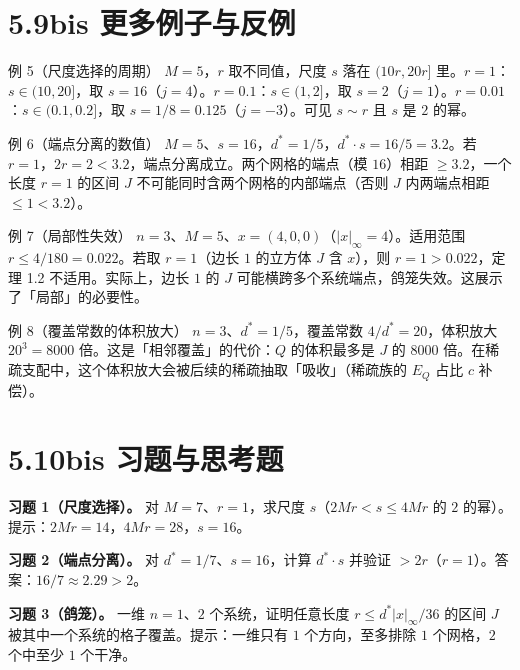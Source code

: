 \documentclass[a4paper,11pt,openany]{ctexbook}
\numberwithin{equation}{chapter}
\numberwithin{figure}{chapter}
\numberwithin{table}{chapter}
\begin{document}
\section{5.9bis 更多例子与反例}

\begin{examplebox}{例 5（尺度选择的周期）}
$M=5$，$r$ 取不同值，尺度 $s$ 落在 $(10r,20r]$ 里。$r=1$：$s\in(10,20]$，取 $s=16$（$j=4$）。$r=0.1$：$s\in(1,2]$，取 $s=2$（$j=1$）。$r=0.01$：$s\in(0.1,0.2]$，取 $s=1/8=0.125$（$j=-3$）。可见 $s\sim r$ 且 $s$ 是 $2$ 的幂。
\end{examplebox}

\begin{examplebox}{例 6（端点分离的数值）}
$M=5$、$s=16$，$d^*=1/5$，$d^*\cdot s=16/5=3.2$。若 $r=1$，$2r=2<3.2$，端点分离成立。两个网格的端点（模 $16$）相距 $\ge3.2$，一个长度 $r=1$ 的区间 $J$ 不可能同时含两个网格的内部端点（否则 $J$ 内两端点相距 $\le1<3.2$）。
\end{examplebox}

\begin{examplebox}{例 7（局部性失效）}
$n=3$、$M=5$、$x=(4,0,0)$（$|x|_\infty=4$）。适用范围 $r\le4/180=0.022$。若取 $r=1$（边长 $1$ 的立方体 $J$ 含 $x$），则 $r=1>0.022$，定理 1.2 不适用。实际上，边长 $1$ 的 $J$ 可能横跨多个系统端点，鸽笼失效。这展示了「局部」的必要性。
\end{examplebox}

\begin{examplebox}{例 8（覆盖常数的体积放大）}
$n=3$、$d^*=1/5$，覆盖常数 $4/d^*=20$，体积放大 $20^3=8000$ 倍。这是「相邻覆盖」的代价：$Q$ 的体积最多是 $J$ 的 $8000$ 倍。在稀疏支配中，这个体积放大会被后续的稀疏抽取「吸收」（稀疏族的 $E_Q$ 占比 $c$ 补偿）。
\end{examplebox}

\section{5.10bis 习题与思考题}

\textbf{习题 1（尺度选择）。} 对 $M=7$、$r=1$，求尺度 $s$（$2Mr<s\le4Mr$ 的 $2$ 的幂）。提示：$2Mr=14$，$4Mr=28$，$s=16$。

\textbf{习题 2（端点分离）。} 对 $d^*=1/7$、$s=16$，计算 $d^*\cdot s$ 并验证 $>2r$（$r=1$）。答案：$16/7\approx2.29>2$。

\textbf{习题 3（鸽笼）。} 一维 $n=1$、$2$ 个系统，证明任意长度 $r\le d^*|x|_\infty/36$ 的区间 $J$ 被其中一个系统的格子覆盖。提示：一维只有 $1$ 个方向，至多排除 $1$ 个网格，$2$ 个中至少 $1$ 个干净。
\end{document}
